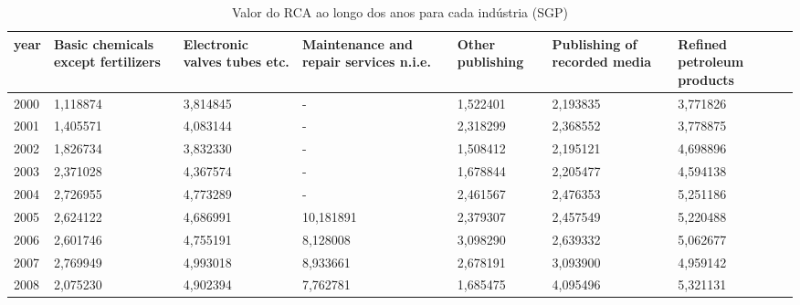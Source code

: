 \begin{table}
\centering
\caption{Valor do RCA ao longo dos anos para cada indústria (SGP)}
\begin{tabular}{p{1cm}p{2cm}p{2cm}p{2cm}p{2cm}p{2cm}p{2cm}}
\toprule
 year &  Basic chemicals except fertilizers &  Electronic valves tubes etc. &  Maintenance and repair services n.i.e. &  Other publishing &  Publishing of recorded media &  Refined petroleum products \\
\midrule
 2000 &                            1,118874 &                      3,814845 &                                       - &          1,522401 &                      2,193835 &                    3,771826 \\
 2001 &                            1,405571 &                      4,083144 &                                       - &          2,318299 &                      2,368552 &                    3,778875 \\
 2002 &                            1,826734 &                      3,832330 &                                       - &          1,508412 &                      2,195121 &                    4,698896 \\
 2003 &                            2,371028 &                      4,367574 &                                       - &          1,678844 &                      2,205477 &                    4,594138 \\
 2004 &                            2,726955 &                      4,773289 &                                       - &          2,461567 &                      2,476353 &                    5,251186 \\
 2005 &                            2,624122 &                      4,686991 &                               10,181891 &          2,379307 &                      2,457549 &                    5,220488 \\
 2006 &                            2,601746 &                      4,755191 &                                8,128008 &          3,098290 &                      2,639332 &                    5,062677 \\
 2007 &                            2,769949 &                      4,993018 &                                8,933661 &          2,678191 &                      3,093900 &                    4,959142 \\
 2008 &                            2,075230 &                      4,902394 &                                7,762781 &          1,685475 &                      4,095496 &                    5,321131 \\

\end{tabular}
\end{table}
